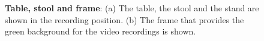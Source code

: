 \begin{figure}
	\centering
		\hspace{0.05\textwidth}

	\caption[Table, stool and frame]{\textbf{Table, stool and frame}:
	(a) The table, the stool and the stand are shown in the recording position.
	(b) The frame that provides the green background for the video recordings
	is shown.}
	\label{fig:linguometer:od:table}
\end{figure}
